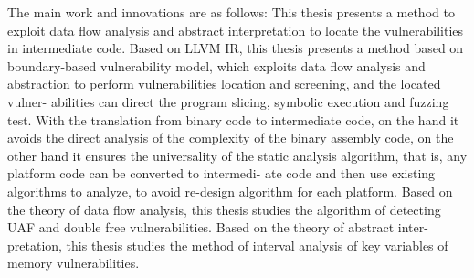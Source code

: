 \begin{eabstract}
The main work and innovations are as follows:
This thesis presents a method to exploit data flow analysis and abstract interpretation
to locate the vulnerabilities in intermediate code. Based on LLVM IR, this thesis presents
a method based on boundary-based vulnerability model, which exploits data flow analysis
and abstraction to perform vulnerabilities location and screening, and the located vulner-
abilities can direct the program slicing, symbolic execution and fuzzing test. With the
translation from binary code to intermediate code, on the hand it avoids the direct analysis
of the complexity of the binary assembly code, on the other hand it ensures the universality
of the static analysis algorithm, that is, any platform code can be converted to intermedi-
ate code and then use existing algorithms to analyze, to avoid re-design algorithm for
each platform. Based on the theory of data flow analysis, this thesis studies the algorithm
of detecting UAF and double free vulnerabilities. Based on the theory of abstract inter-
pretation, this thesis studies the method of interval analysis of key variables of memory
vulnerabilities.


\end{eabstract}

